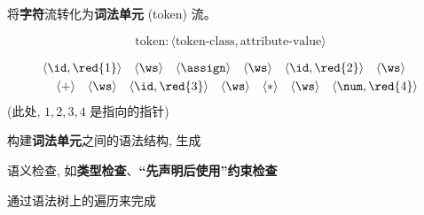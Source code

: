 \begin{frame}{}
  \begin{center}
     将{\bf 字符}流转化为{\bf 词法单元} (token) 流。

    \[
      \boxed{\text{token}: \langle \text{token-class}, \text{attribute-value} \rangle}
    \]


    \begin{align*}
      \langle \id, \red{1} \rangle \quad 
      \langle \ws \rangle \quad
      \langle \assign \rangle \quad
      \langle \ws \rangle \quad
      \langle \id, \red{2} \rangle \quad
      \langle \ws \rangle \quad \\
      \langle + \rangle \quad
      \langle \ws \rangle \quad
      \langle \id, \red{3} \rangle \quad
      \langle \ws \rangle \quad
      \langle \ast \rangle \quad
      \langle \ws \rangle \quad
      \langle \num, \red{4} \rangle
    \end{align*}
    (此处, $1, 2, 3, 4$ 是指向的指针)
  \end{center}
\end{frame}

\begin{frame}{}
  \begin{center}
     构建{\bf 词法单元}之间的语法结构, 生成

    \vspace{0.80cm}
  \end{center}
\end{frame}

\begin{frame}{}
  \begin{center}
     语义检查, 如{\bf 类型检查}、{\bf ``先声明后使用''约束检查}

    \vspace{0.80cm}

    \vspace{0.30cm}
    通过语法树上的遍历来完成
  \end{center}
\end{frame}

